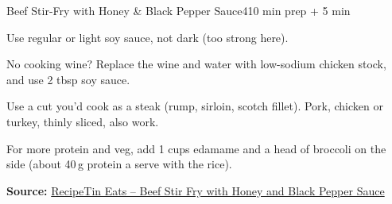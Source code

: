 \begin{recipebox}{Beef Stir-Fry with Honey \& Black Pepper Sauce}{4}{10 min prep + 5 min}
\begin{notelist}
  \item Use regular or light soy sauce, not dark (too strong here).
  \item No cooking wine? Replace the wine and water with low-sodium chicken stock,
        and use 2 tbsp soy sauce.
  \item Use a cut you'd cook as a steak (rump, sirloin, scotch fillet). Pork,
        chicken or turkey, thinly sliced, also work.
  \item For more protein and veg, add 1 cups edamame and a head of
        broccoli on the side (about 40\,g protein a serve with the rice).
\end{notelist}

\noindent\textbf{Source:} \href{https://www.recipetineats.com/chinese-beef-with-honey-and-black-pepper-sauce/}{RecipeTin Eats -- Beef Stir Fry with Honey and Black Pepper Sauce}

\end{recipebox}
